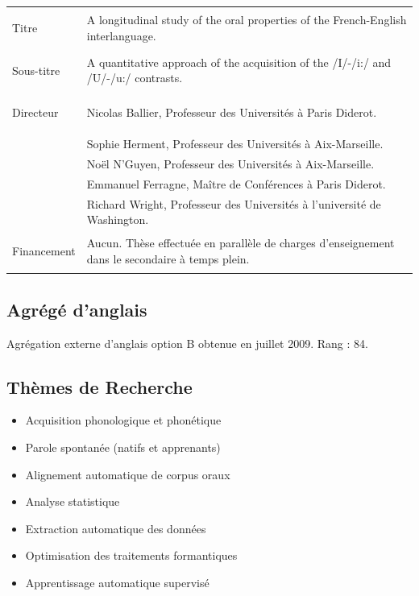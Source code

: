 \documentclass[
  10pt,
]{article}
\providecommand{\tightlist}{%
  \setlength{\itemsep}{0pt}\setlength{\parskip}{0pt}}
\begin{document}
\begin{table}[H]
\centering
\begin{tabular}{>{\bfseries\raggedright\arraybackslash}p{2.5cm}>{\raggedright\arraybackslash}p{14cm}}
\toprule
Titre & A longitudinal study of the oral properties of the French-English interlanguage.\\
Sous-titre & A quantitative approach of the acquisition of the /I/-/i:/ and /U/-/u:/ contrasts.\\

Directeur & Nicolas Ballier, Professeur des Universités à Paris Diderot.\\

 & Sophie Herment, Professeur des Universités à Aix-Marseille.\\

\multirow[t]{-2}{2.5cm}{\raggedright\arraybackslash Rapporteurs} & Noël N'Guyen, Professeur des Universités à Aix-Marseille.\\

 & Emmanuel Ferragne, Maître de Conférences à Paris Diderot.\\

\multirow[t]{-2}{2.5cm}{\raggedright\arraybackslash Examinateurs} & Richard  Wright, Professeur des Universités à l'université de Washington.\\

Financement & Aucun. Thèse effectuée en parallèle de charges d'enseignement dans le secondaire à temps plein.\\
\bottomrule
\end{tabular}
\end{table}

\hypertarget{agruxe9guxe9-danglais}{%
\subsection{Agrégé d'anglais}\label{agruxe9guxe9-danglais}}

Agrégation externe d'anglais option B obtenue en juillet 2009.
Rang : 84.

\hypertarget{thuxe8mes-de-recherche}{%
\subsection{Thèmes de Recherche}\label{thuxe8mes-de-recherche}}

\begin{itemize}
\tightlist
\item
  Acquisition phonologique et phonétique
\item
  Parole spontanée (natifs et apprenants)
\item
  Alignement automatique de corpus oraux
\item
  Analyse statistique
\item
  Extraction automatique des données
\item
  Optimisation des traitements formantiques
\item
  Apprentissage automatique supervisé
\end{itemize}
\end{document}
